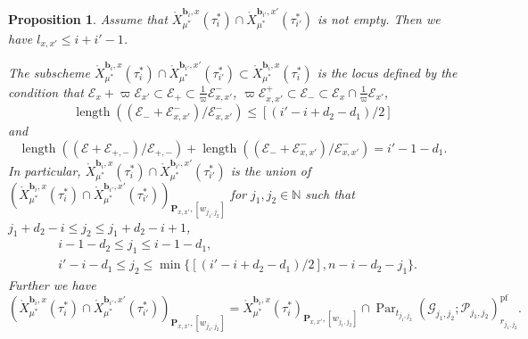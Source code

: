 \documentclass[10pt,a4paper]{amsart}
\newtheorem{prop}{Proposition}
\DeclareMathOperator{\Par}{Par}
\newcommand{\bN}{\mathbb{N}}
\newcommand{\bfP}{\mathbf{P}}
\newcommand{\bfb}{\mathbf{b}}
\newcommand{\cE}{\mathcal{E}}
\DeclareMathOperator{\length}{length}
\newcommand{\pf}{\mathrm{pf}}
\newcommand{\sG}{\mathscr{G}}
\newcommand{\sP}{\mathscr{P}}
\begin{document}
\begin{prop}\label{prop:inter}
Assume that 
$\mathring{X}_{\mu^*}^{\bfb_i,x}(\tau_i^*) \cap \mathring{X}_{\mu^*}^{\bfb_{i'},x'}(\tau_{i'}^*)$ 
is not empty. 
Then we have $l_{x,x'} \leq i+i'-1$. 

The subscheme 
$\mathring{X}_{\mu^*}^{\bfb_i,x}(\tau_i^*) \cap \mathring{X}_{\mu^*}^{\bfb_{i'},x'}(\tau_{i'}^*) \subset \mathring{X}_{\mu^*}^{\bfb_{i},x}(\tau_{i}^*)$ is the locus defined by the condition that 
$\cE_x +\varpi \cE_{x'} \subset \cE_+ \subset \frac{1}{\varpi} \cE_{x,x'}^-$, 
$\varpi \cE_{x,x'}^+ \subset \cE_- \subset \cE_x \cap \frac{1}{\varpi} \cE_{x'}$, 
\begin{equation}\label{eq:lengE-}
 \length ((\cE_- +\cE_{x,x'}^-)/ \cE_{x,x'}^- ) \leq  [(i'-i+d_2 -d_1 )/2] 
\end{equation} 
and 
\begin{equation}\label{eq:lengsum}
 \length ((\cE +\cE_{+,-} )/ \cE_{+,-}) + \length ((\cE_- +\cE_{x,x'}^-)/ \cE_{x,x'}^- ) = i'-1 -d_1. 
\end{equation} 
In particular,  
$\mathring{X}_{\mu^*}^{\bfb_i,x}(\tau_i^*) \cap \mathring{X}_{\mu^*}^{\bfb_{i'},x'}(\tau_{i'}^*)$ 
is the union of 
$\left( \mathring{X}_{\mu^*}^{\bfb_i,x}(\tau_i^*) \cap \mathring{X}_{\mu^*}^{\bfb_{i'},x'}(\tau_{i'}^*) \right)_{\bfP_{x,x'},[w_{j_1,j_2}]}$ 
for 
$j_1,j_2 \in \bN$ such that $j_1 +d_2 -i \leq j_2 \leq j_1 +d_2-i +1$, 
\begin{align*}
    &i-1-d_2 \leq j_1 \leq i-1-d_1
    ,\\  
 &
 i' -i -d_1 \leq 
 j_2 \leq \min \{ 
 [(i'-i+d_2 -d_1 )/2] 
 , n-i-d_2 -j_1 
 \}. 
\end{align*}
Further we have 
\[
 \left( \mathring{X}_{\mu^*}^{\bfb_i,x}(\tau_i^*) \cap \mathring{X}_{\mu^*}^{\bfb_{i'},x'}(\tau_{i'}^*)  \right)_{\bfP_{x,x'},[w_{j_1,j_2}]} = 
 \mathring{X}_{\mu^*}^{\bfb_i,x}(\tau_i^*)_{\bfP_{x,x'},[w_{j_1,j_2}]} 
 \cap \Par_{t_{j_1,j_2}} 
(\sG_{j_1,j_2}; \sP_{j_1,j_2})_{r_{j_1,j_2}}^{\pf} . 
\] 
\end{prop}
\end{document}
